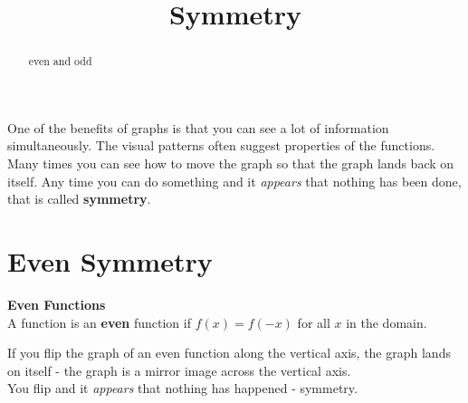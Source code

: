 \documentclass{ximera}
\title{Symmetry}
\begin{document}
\begin{abstract}
even and odd
\end{abstract}
\maketitle



One of the benefits of graphs is that you can see a lot of information simultaneously.  The visual patterns often suggest properties of the functions.  Many times you can see how to move the graph so that the graph lands back on itself.  Any time you can do something and it \textit{appears} that nothing has been done, that is called \textbf{symmetry}.





\section{Even Symmetry}


\begin{definition} \textbf{\textcolor{green!50!black}{Even Functions}} \\

A function is an \textbf{even} function if $f(x) = f(-x)$ for all $x$ in the domain.

\end{definition}


If you flip the graph of an even function along the vertical axis, the graph lands on itself - the graph is a mirror image across the vertical axis. \\

You flip and it \textit{appears} that nothing has happened - symmetry. \\
\end{document}
